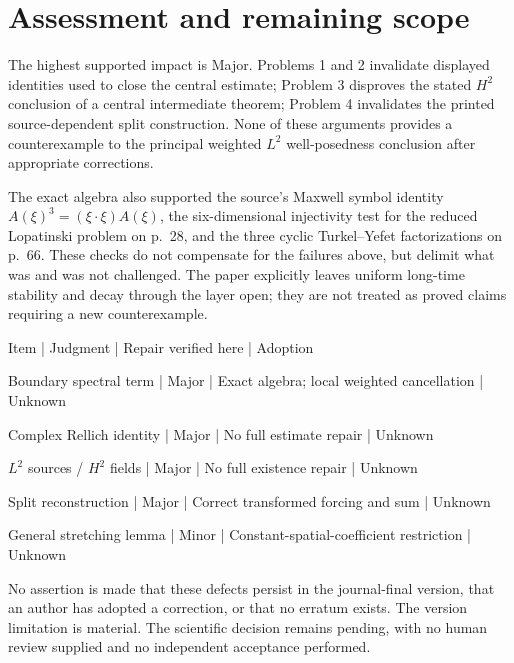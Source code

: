\documentclass[10pt]{article}
\begin{document}
\section*{Assessment and remaining scope}
The highest supported impact is Major. Problems 1 and 2 invalidate displayed identities used to close the central estimate; Problem 3 disproves the stated \(H^2\) conclusion of a central intermediate theorem; Problem 4 invalidates the printed source-dependent split construction. None of these arguments provides a counterexample to the principal weighted \(L^2\) well-posedness conclusion after appropriate corrections.\par
The exact algebra also supported the source’s Maxwell symbol identity \(A(\xi)^3=(\xi\cdot\xi)A(\xi)\), the six-dimensional injectivity test for the reduced Lopatinski problem on p. 28, and the three cyclic Turkel–Yefet factorizations on p. 66. These checks do not compensate for the failures above, but delimit what was and was not challenged. The paper explicitly leaves uniform long-time stability and decay through the layer open; they are not treated as proved claims requiring a new counterexample.\par
Item | Judgment | Repair verified here | Adoption\par
Boundary spectral term | Major | Exact algebra; local weighted cancellation | Unknown\par
Complex Rellich identity | Major | No full estimate repair | Unknown\par
\(L^2\) sources / \(H^2\) fields | Major | No full existence repair | Unknown\par
Split reconstruction | Major | Correct transformed forcing and sum | Unknown\par
General stretching lemma | Minor | Constant-spatial-coefficient restriction | Unknown\par
No assertion is made that these defects persist in the journal-final version, that an author has adopted a correction, or that no erratum exists. The version limitation is material. The scientific decision remains pending, with no human review supplied and no independent acceptance performed.\par
\end{document}
